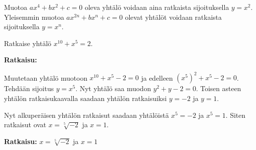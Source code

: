 Muotoa $ax^4+bx^2+c=0$ oleva yhtälö voidaan aina ratkaista sijoituksella $y=x^2$.  Yleisemmin muotoa $ax^{2n}+bx^n+c=0$ olevat yhtälöt voidaan ratkaista sijoituksella $y = x^n$.

\begin{esimerkki}
Ratkaise yhtälö $x^{10}+x^5=2$.

\textbf{Ratkaisu:}

Muutetaan yhtälö muotoon $x^{10}+x^5-2=0$ ja edelleen $(x^5)^2+x^5-2=0$. Tehdään sijoitus $y = x^5$. Nyt yhtälö saa muodon $y^2+y-2 = 0$. Toisen asteen yhtälön ratkaisukaavalla saadaan yhtälön ratkaisuiksi $y = -2$ ja $y = 1$.

Nyt alkuperäisen yhtälön ratkaisut saadaan yhtälöistä $x^5=-2$ ja $x^5=1$. Siten ratkaisut ovat $x = \sqrt[5]{-2}$ ja $x = 1$.

\textbf{Ratkaisu:} $x = \sqrt[5]{-2}$ ja $x = 1$

\end{esimerkki}

